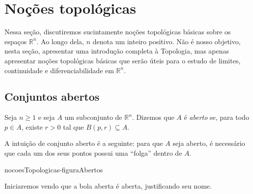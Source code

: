 \section{Noções topológicas}
Nessa seção, discutiremos sucintamente noções topológicas básicas sobre os espaços $\mathbb R^n$.
Ao longo dela, $n$ denota um inteiro positivo.
Não é nosso objetivo, nesta seção, apresentar uma introdução completa à Topologia, mas apenas apresentar noções topológicas básicas que serão úteis para o estudo de limites, continuidade e diferenciabilidade em $\mathbb R^n$.

\subsection{Conjuntos abertos}

\begin{definition}
    Seja $n\geq 1$ e seja $A$ um subconjunto de $\mathbb R^n$.
    Dizemos que $A$ é \emph{aberto} se, para todo $p\in A$, existe $r>0$ tal que $B(p, r)\subseteq A$.
\end{definition}

A intuição de conjunto aberto é a seguinte: para que $A$ seja aberto, é necessário que cada um dos seus pontos possui uma ``folga'' dentro de $A$.

{nocoesTopologicas-figuraAbertos}

Iniciaremos vendo que a bola aberta é aberta, justificando seu nome.

